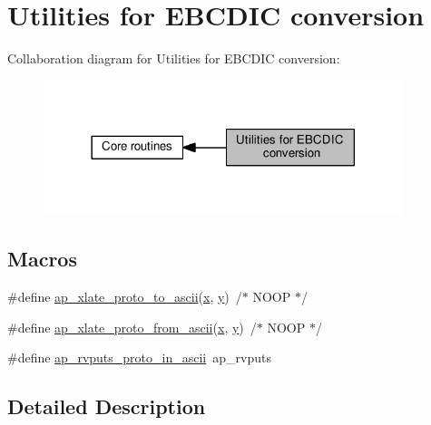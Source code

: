 \hypertarget{group__APACHE__CORE__EBCDIC}{}\section{Utilities for E\+B\+C\+D\+IC conversion}
\label{group__APACHE__CORE__EBCDIC}
Collaboration diagram for Utilities for E\+B\+C\+D\+IC conversion\+:
\nopagebreak
\begin{figure}[H]
\begin{center}
\leavevmode
\includegraphics[width=297pt]{group__APACHE__CORE__EBCDIC}
\end{center}
\end{figure}
\subsection*{Macros}
\begin{DoxyCompactItemize}
\item 
\#define \hyperlink{group__APACHE__CORE__EBCDIC_gab64dbae9ff27269fd9e52c43cb142c16}{ap\+\_\+xlate\+\_\+proto\+\_\+to\+\_\+ascii}(\hyperlink{pcregrep_8txt_a4242e9148f20c002763bf4ba53b26ad6}{x},  \hyperlink{group__MOD__CACHE_gad4d47f76a849e2c428e3dd7f8c4eab1f}{y})~/$\ast$ N\+O\+OP $\ast$/
\item 
\#define \hyperlink{group__APACHE__CORE__EBCDIC_gad8d6e268d45b4380e6b00371795b12c7}{ap\+\_\+xlate\+\_\+proto\+\_\+from\+\_\+ascii}(\hyperlink{pcregrep_8txt_a4242e9148f20c002763bf4ba53b26ad6}{x},  \hyperlink{group__MOD__CACHE_gad4d47f76a849e2c428e3dd7f8c4eab1f}{y})~/$\ast$ N\+O\+OP $\ast$/
\item 
\#define \hyperlink{group__APACHE__CORE__EBCDIC_gaffc517e552f5897ea1d35f9bdde2796b}{ap\+\_\+rvputs\+\_\+proto\+\_\+in\+\_\+ascii}~ap\+\_\+rvputs
\end{DoxyCompactItemize}


\subsection{Detailed Description}


